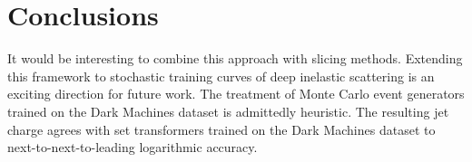 \section{Conclusions}\label{sec:conclusions}

It would be interesting to combine this approach with slicing methods.
Extending this framework to stochastic training curves of deep inelastic
scattering is an exciting direction for future work. The treatment of
Monte Carlo event generators trained on the Dark Machines dataset is
admittedly heuristic. The resulting jet charge agrees with set
transformers trained on the Dark Machines dataset to
next-to-next-to-leading logarithmic accuracy.

